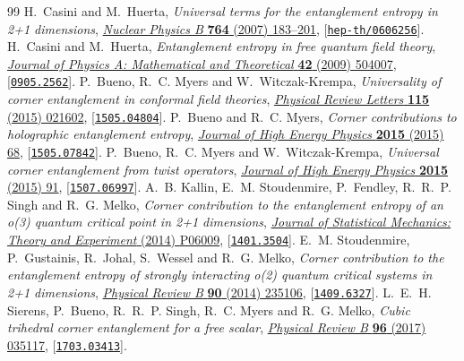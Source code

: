 \documentclass[10pt,a4paper]{amsart}
\theoremstyle{definition}
\begin{document}
\begin{thebibliography}{99}
 H.~Casini and M.~Huerta, \emph{Universal terms for the entanglement entropy in 2+1 dimensions}, \href{http://dx.doi.org/10.1016/j.nuclphysb.2006.12.012}{\emph{Nuclear Physics B} {\bf 764} (2007) 183--201}, [\href{https://arxiv.org/abs/hep-th/0606256}{{\tt hep-th/0606256}}].
 H.~Casini and M.~Huerta, \emph{Entanglement entropy in free quantum field theory}, \href{http://dx.doi.org/10.1088/1751-8113/42/50/504007}{\emph{Journal of Physics A: Mathematical and Theoretical} {\bf 42} (2009) 504007}, [\href{https://arxiv.org/abs/0905.2562}{{\tt 0905.2562}}].
 P.~Bueno, R.~C. Myers and W.~Witczak-Krempa, \emph{Universality of corner entanglement in conformal field theories}, \href{http://dx.doi.org/10.1103/PhysRevLett.115.021602}{\emph{Physical Review Letters} {\bf 115} (2015) 021602}, [\href{https://arxiv.org/abs/1505.04804}{{\tt 1505.04804}}].
 P.~Bueno and R.~C. Myers, \emph{Corner contributions to holographic entanglement entropy}, \href{http://dx.doi.org/10.1007/JHEP08(2015)068}{\emph{Journal of High Energy Physics} {\bf 2015} (2015) 68}, [\href{https://arxiv.org/abs/1505.07842}{{\tt 1505.07842}}].
 P.~Bueno, R.~C. Myers and W.~Witczak-Krempa, \emph{Universal corner entanglement from twist operators}, \href{http://dx.doi.org/10.1007/JHEP09(2015)091}{\emph{Journal of High Energy Physics} {\bf 2015} (2015) 91}, [\href{https://arxiv.org/abs/1507.06997}{{\tt 1507.06997}}].
 A.~B. Kallin, E.~M. Stoudenmire, P.~Fendley, R.~R.~P. Singh and R.~G. Melko, \emph{Corner contribution to the entanglement entropy of an o(3) quantum critical point in 2+1 dimensions}, \href{http://dx.doi.org/10.1088/1742-5468/2014/06/P06009}{\emph{Journal of Statistical Mechanics: Theory and Experiment} (2014) P06009}, [\href{https://arxiv.org/abs/1401.3504}{{\tt 1401.3504}}].
 E.~M. Stoudenmire, P.~Gustainis, R.~Johal, S.~Wessel and R.~G. Melko, \emph{Corner contribution to the entanglement entropy of strongly interacting o(2) quantum critical systems in 2+1 dimensions}, \href{http://dx.doi.org/10.1103/PhysRevB.90.235106}{\emph{Physical Review B} {\bf 90} (2014) 235106}, [\href{https://arxiv.org/abs/1409.6327}{{\tt 1409.6327}}].
 L.~E.~H. Sierens, P.~Bueno, R.~R.~P. Singh, R.~C. Myers and R.~G. Melko, \emph{Cubic trihedral corner entanglement for a free scalar}, \href{http://dx.doi.org/10.1103/PhysRevB.96.035117}{\emph{Physical Review B} {\bf 96} (2017) 035117}, [\href{https://arxiv.org/abs/1703.03413}{{\tt 1703.03413}}].

\end{thebibliography}
\end{document}
